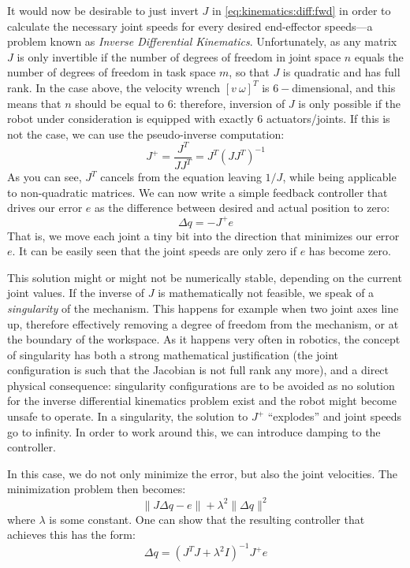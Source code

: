 It would now be desirable to just invert $J$ in \cref{eq:kinematics:diff:fwd} in order to calculate the necessary joint speeds for every desired end-effector speeds---a problem known as \textsl{Inverse Differential Kinematics}. Unfortunately, as any matrix $J$ is only invertible if the number of degrees of freedom in joint space $n$ equals the number of degrees of freedom in task space $m$, so that $ J$ is quadratic and has full rank.
In the case above, the velocity wrench $[v \ \omega]^T$ is $6-$dimensional, and this means that $n$ should be equal to $6$: therefore, inversion of $J$ is only possible if the robot under consideration is equipped with exactly $6$ actuators/joints.
If this is not the case, we can use the pseudo-inverse computation:
\begin{equation}
J^+=\frac{J^T}{JJ^T}=J^T(JJ^T)^{-1}
\end{equation}
As you can see, $J^T$ cancels from the equation leaving $1/J$, while being applicable to non-quadratic matrices.
We can now write a simple feedback controller that drives our error $e$ as the difference between desired and actual position to zero:
\begin{equation}
\Delta{q}=-J^+e
\end{equation}
That is, we move each joint a tiny bit into the direction that minimizes our error $e$.
It can be easily seen that the joint speeds are only zero if $e$ has become zero.

This solution might or might not be numerically stable, depending on the current joint values. If the inverse of $J$ is mathematically not feasible, we speak of a \textsl{singularity} of the mechanism. This happens for example when two joint axes line up, therefore effectively removing a degree of freedom from the mechanism, or at the boundary of the workspace. As it happens very often in robotics, the concept of singularity has both a strong mathematical justification (the joint configuration is such that the Jacobian is not full rank any more), and a direct physical consequence: singularity configurations are to be avoided as no solution for the inverse differential kinematics problem exist and the robot might become unsafe to operate.
In a singularity, the solution to $ J^+$ ``explodes'' and joint speeds go to infinity. In order to work around this, we can introduce damping to the controller.

In this case, we do not only minimize the error, but also the joint velocities. The minimization problem then becomes:
\begin{equation}
\|J\Delta q-e\|+\lambda^2\|\Delta q\|^2
\end{equation}
where $\lambda$ is some constant. One can show that the resulting controller that achieves this has the form:
\begin{equation}
\Delta q=(J^TJ+\lambda^2 I)^{-1}J^+e
\end{equation}

